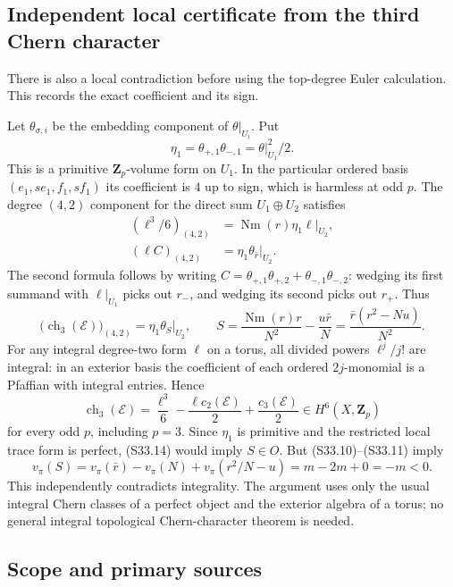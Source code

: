 \subsection{Independent local certificate from the third Chern character}\label{independent-local-certificate-from-the-third-chern-character}

There is also a local contradiction before using the top-degree Euler calculation. This records the exact coefficient and its sign.

Let \(\theta_{\sigma,i}\) be the embedding component of \(\theta|_{U_i}\). Put \[
 \eta_1=\theta_{+,1}\theta_{-,1}
       =\theta|_{U_1}^2/2.
\] This is a primitive \(\mathbf Z_p\)-volume form on \(U_1\). In the particular ordered basis \((e_1,se_1,f_1,sf_1)\) its coefficient is \(4\) up to sign, which is harmless at odd \(p\). The degree \((4,2)\) component for the direct sum \(U_1\oplus U_2\) satisfies \[
 \begin{aligned}
 (\ell^3/6)_{(4,2)}
    &=\operatorname{Nm}(r)\eta_1\ell|_{U_2},\\
 (\ell C)_{(4,2)}
    &=\eta_1\theta_{\bar r}|_{U_2}.
 \end{aligned}
\] The second formula follows by writing \(C=\theta_{+,1}\theta_{+,2}+\theta_{-,1}\theta_{-,2}\): wedging its first summand with \(\ell|_{U_1}\) picks out \(r_-\), and wedging its second picks out \(r_+\). Thus \[
 \bigl(\operatorname{ch}_3(\mathcal E)\bigr)_{(4,2)}
 =\eta_1\theta_S|_{U_2},
 \qquad
 S=\frac{\operatorname{Nm}(r)r}{N^2}-\frac{u\bar r}{N}
   =\frac{\bar r(r^2-Nu)}{N^2}.
 \tag{S33.14}
\] For any integral degree-two form \(\ell\) on a torus, all divided powers \(\ell^j/j!\) are integral: in an exterior basis the coefficient of each ordered \(2j\)-monomial is a Pfaffian with integral entries. Hence \[
 \operatorname{ch}_3(\mathcal E)
 =\frac{\ell^3}{6}-\frac{\ell c_2(\mathcal E)}2
                         +\frac{c_3(\mathcal E)}2
 \in H^6(X,\mathbf Z_p)
\] for every odd \(p\), including \(p=3\). Since \(\eta_1\) is primitive and the restricted local trace form is perfect, (S33.14) would imply \(S\in O\). But (S33.10)--(S33.11) imply \[
 v_\pi(S)=v_\pi(\bar r)-v_\pi(N)
                  +v_\pi(r^2/N-u)=m-2m+0=-m<0.
\] This independently contradicts integrality. The argument uses only the usual integral Chern classes of a perfect object and the exterior algebra of a torus; no general integral topological Chern-character theorem is needed.

\subsection{Scope and primary sources}\label{scope-and-primary-sources}

